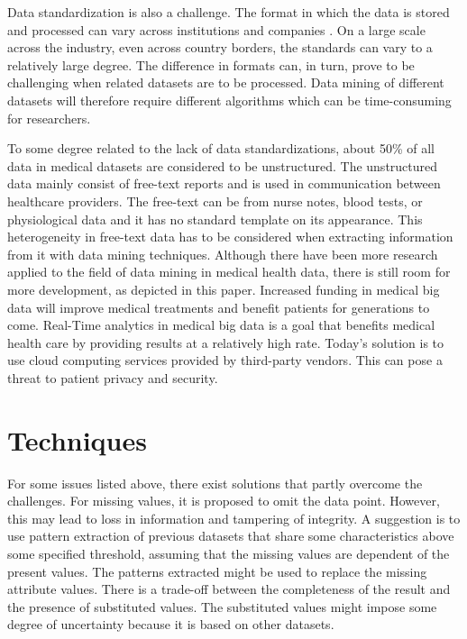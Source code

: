 Data standardization is also a challenge. The format in which the data is stored and processed can vary across institutions and companies . On a large scale across the industry, even across country borders, the standards can vary to a relatively large degree. The difference in formats can, in turn, prove to be challenging when related datasets are to be processed. Data mining of different datasets will therefore require different algorithms which can be time-consuming for researchers. 

To some degree related to the lack of data standardizations, about 50\% of all data in medical datasets are considered to be unstructured\cite{wp}. The unstructured data mainly consist of free-text reports and is used in communication between healthcare providers. The free-text can be from nurse notes, blood tests, or physiological data and it has no standard template on its appearance. This heterogeneity in free-text data has to be considered when extracting information from it with data mining techniques. 
 Although there have been more research applied to the field of data mining in medical health data, there is still room for more development, as depicted in this paper. Increased funding in medical big data will improve medical treatments and benefit patients for generations to come. 
Real-Time analytics in medical big data is a goal that benefits medical health care by providing results at a relatively high rate.\cite{kek} Today’s solution is to use cloud computing services provided by third-party vendors. This can pose a threat to patient privacy and security.


\section{Techniques}

For some issues listed above, there exist solutions that partly overcome the challenges. For missing values, it is proposed to omit the data point. However, this may lead to loss in information and tampering of integrity. A suggestion is to use pattern extraction of previous datasets that share some characteristics above some specified threshold, assuming that the missing values are dependent of the present values. The patterns extracted might be used to replace the missing attribute values. There is a trade-off between the completeness of the result and the presence of substituted values. The substituted values might impose some degree of uncertainty because it is based on other datasets. 

